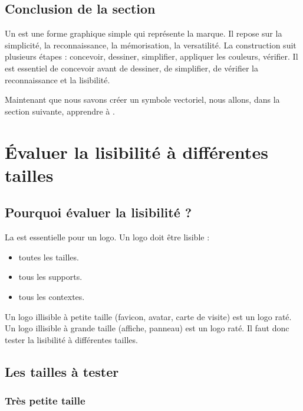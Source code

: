 \subsection*{Conclusion de la section}

Un  est une forme graphique simple qui représente la marque. Il repose sur la simplicité, la reconnaissance, la mémorisation, la versatilité. La construction suit plusieurs étapes : concevoir, dessiner, simplifier, appliquer les couleurs, vérifier. Il est essentiel de concevoir avant de dessiner, de simplifier, de vérifier la reconnaissance et la lisibilité.

Maintenant que nous savons créer un symbole vectoriel, nous allons, dans la section suivante, apprendre à .

\section{Évaluer la lisibilité à différentes tailles}

\subsection{Pourquoi évaluer la lisibilité ?}

La  est essentielle pour un logo. Un logo doit être lisible :

\begin{itemize}
    \item {} toutes les tailles.
    \item {} tous les supports.
    \item {} tous les contextes.
\end{itemize}

Un logo illisible à petite taille (favicon, avatar, carte de visite) est un logo raté. Un logo illisible à grande taille (affiche, panneau) est un logo raté. Il faut donc tester la lisibilité à différentes tailles.

\subsection{Les tailles à tester}

\subsubsection{Très petite taille}

